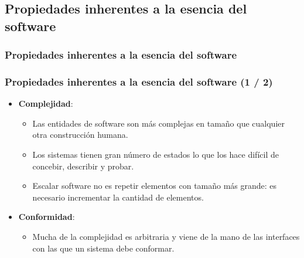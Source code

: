 \documentclass{beamer}
\begin{document}
\subsection{Propiedades inherentes a la esencia del software}
\frametitle{Propiedades inherentes a la esencia del software}
\begin{frame}
\frametitle{Propiedades inherentes a la esencia del software (1 / 2)}
\begin{itemize}
	\item \textbf{Complejidad}:
			\begin{itemize}
				\item Las entidades de software son más complejas en tamaño que cualquier otra construcción humana.
				\item Los sistemas tienen gran número de estados lo que los hace difícil de concebir, describir y probar.
				\item Escalar software no es repetir elementos con tamaño más grande: es necesario incrementar la cantidad de elementos.
			\end{itemize}
	\item \textbf{Conformidad}:
			\begin{itemize}
				\item Mucha de la complejidad es arbitraria y viene de la mano de las interfaces con las que un sistema debe conformar.			
			\end{itemize}
	  
\end{itemize}

\end{frame}
\end{document}
